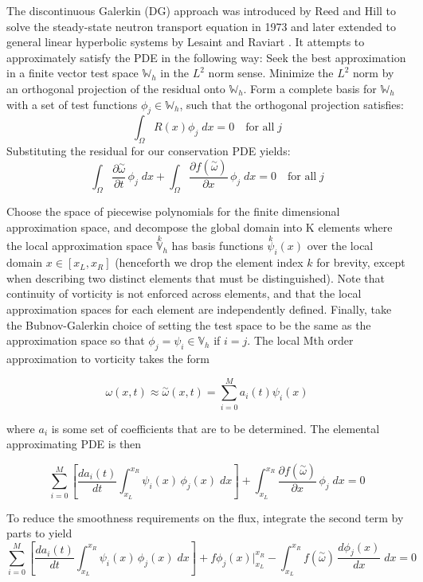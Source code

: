 \documentclass[letterpaper,12pt]{report}
\newcommand{\be}{\begin{equation}}
\newcommand{\ben}[1]{\begin{equation}\label{#1}}
\newcommand{\ee}{\end{equation}}
\newcommand{\aomega}{\overset{\sim}{\omega}}				%
\begin{document}
The discontinuous Galerkin (DG) approach was introduced by Reed and Hill to solve the steady-state neutron transport equation in 1973 \cite{ReedHill} and later extended to general linear hyperbolic systems by Lesaint and Raviart \cite{Lesaint}. It attempts to approximately satisfy the PDE in the following way: Seek the best approximation in a finite vector test space $\mathbb{W}_h$  in the $L^2$ norm sense. Minimize the $L^2$ norm by an orthogonal projection of the residual onto $\mathbb{W}_h$. Form a complete basis for $\mathbb{W}_h$ with a set of test functions $\phi_j \in \mathbb{W}_h$, such that the orthogonal projection satisfies:
\be \int_\Omega R(x) \phi_j \;dx = 0 \quad\mbox{for all}\; j\ee
Substituting the residual for our conservation PDE yields:
\be \int_\Omega \frac{\partial \aomega}{\partial t} \, \phi_j \;dx + \int_\Omega \frac{\partial f(\aomega)}{\partial x} \, \phi_j \;dx = 0 \quad\mbox{for all}\; j\ee

Choose the space of piecewise polynomials for the finite dimensional approximation space, and decompose the global domain into K elements where the local approximation space $\overset{k}{\mathbb{V}}_h$ has basis functions $\overset{k}{\psi}_i(x)$ over the local domain $x \in [x_L, x_R]$ (henceforth we drop the element index $k$ for brevity, except when describing two distinct elements that must be distinguished). Note that continuity of vorticity is not enforced across elements, and that the local approximation spaces for each element are independently defined. Finally, take the Bubnov-Galerkin choice of setting the test space to be the same as the approximation space so that $\phi_j=\psi_i \in \mathbb{V}_h$ if $i=j$. The local Mth order approximation to vorticity takes the form

\be \omega(x,t) \approx \aomega(x,t) = \sum_{i=0}^M a_i(t)\psi_i(x)\ee

where $a_i$ is some set of coefficients that are to be determined. The elemental approximating PDE is then

\be \sum_{i=0}^M \left[ \frac{d a_i(t)}{dt}\int_{x_L}^{x_R}\psi_i(x)  \, \phi_j(x) \;dx \right]
+ \int_{x_L}^{x_R} \frac{\partial f(\aomega)}{\partial x} \, \phi_j \;dx = 0 \ee

To reduce the smoothness requirements on the flux, integrate the second term by parts to yield
\ben{DGtemp} \sum_{i=0}^M \left[ \frac{d a_i(t)}{dt}\int_{x_L}^{x_R}\psi_i(x)  \, \phi_j(x) \;dx \right]
+ f\phi_j(x) \Big|^{x_R}_{x_L} 
- \int_{x_L}^{x_R} f(\aomega) \, \frac{d \phi_j(x)}{d x} \;dx = 0 \ee
\end{document}
